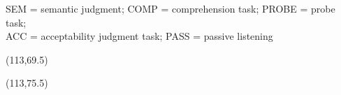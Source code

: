 \documentclass[final]{beamer}
\begin{document}
\begin{frame}{}
\begin{textblock}{67}
SEM = semantic judgment; COMP = comprehension task; PROBE = probe task; \\ ACC = acceptability judgment task; PASS = passive listening 
\end{textblock}

%
%

\begin{textblock}{10}(113,69.5)
\end{textblock}
\begin{textblock}{10}(113,75.5)
\end{textblock}

\end{frame}
\end{document}
